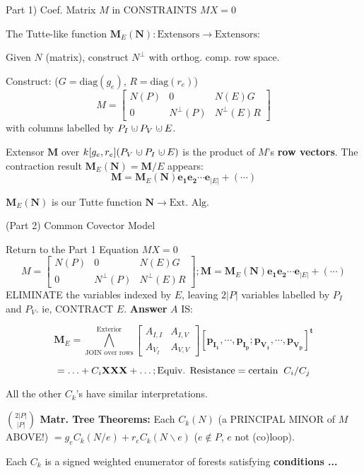 \documentclass{beamer}
\newcommand{\dunion}
{\mbox{\hbox{\hskip0.45em$\cdot$\hskip-0.44em$\cup$\hskip0.2em}}}
\begin{document}
\begin{frame}
{Part 1) Coef. Matrix $M$ in CONSTRAINTS $MX=0$}
\begin{center}
The Tutte-like function $\mathbf{M}_E(\mathbf{N}):\text{Extensors}\rightarrow\text{Extensors}$:
\end{center}

Given $N$ (matrix), construct $N^\perp$ 
with orthog. comp. row space.

Construct:  ($G=\mbox{diag}(g_e)$, $R=\mbox{diag}(r_e)$)
\[
M = \left[\begin{array}{c|c|c} N(P)  &  0  &  N(E)G \\  \hline
0  & N^{\perp}(P)  &  N^{\perp}(E)R \end{array}\right]
\]
with columns labelled by $P_I\dunion P_V\dunion E$.

Extensor $\mathbf{M}$ over $k[g_e, r_e](P_V\dunion P_I \dunion E)$
is the product of $M$'s \textbf{row vectors}. The contraction result
$\mathbf{M}_E(\mathbf{N}) = \mathbf{M}/E$ appears:
\[
\mathbf{M} = \mathbf{M}_E(\mathbf{N})\mathbf{e_1}\mathbf{e_2}\cdots\mathbf{e}_{|E|} + (\cdots) 
\]

$\mathbf{M}_E(\mathbf{N})$ is our Tutte function $\mathbf{N}\rightarrow \text{Ext. Alg.}$
\end{frame}

\begin{frame}{(Part 2) Common Covector Model}

\end{frame}

\begin{frame}{Return to the Part 1 Equation $MX=0$}
\[
M = \left[\begin{array}{c|c|c} N(P)  &  0  &  N(E)G \\  \hline
0  & N^{\perp}(P)  &  N^{\perp}(E)R \end{array}\right]
;
\mathbf{M} = \mathbf{M}_E(\mathbf{N})\mathbf{e_1}\mathbf{e_2}\cdots\mathbf{e}_{|E|} + (\cdots) 
\]
ELIMINATE the variables indexed by $E$, leaving $2|P|$ variables
labelled by $P_I$ and $P_V$.  ie, CONTRACT $E$. \textbf{Answer} $A$ IS:

\[
\mathbf{M}_E = \bigwedge^{\text{Exterior}}_{\text{JOIN over rows}} \left[\begin{array}{c|c} A_{I,I}  &  A_{I,V}   \\  \hline
    A_{V_I}  & A_{V,V} \end{array}\right] 
[\mathbf{p_{I_1}, \cdots, p_{I_p}; p_{V_1}, \cdots, p_{V_p}}]^{\mathbf{t}} 
\]

\[
 = \ldots + C_i\mbox{\bf XXX} + \ldots; \text{Equiv. Resistance} = 
\text{certain}\;\; C_i/C_j
\]

All the other $C_k$'s have similar interpretations.

{\bf $\binom{2|P|}{|P|}$ Matr. Tree Theorems:}
Each $C_k(N)$ (a PRINCIPAL MINOR of $M$ ABOVE!)
$= 
g_e C_k(N/e) + r_e C_k(N\backslash e)$ ($e\not\in P$, $e$ not (co)loop).

Each $C_k$ is a signed weighted enumerator of
forests satisfying \textbf{conditions ...}
\end{frame}
\end{document}
